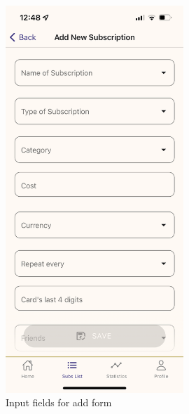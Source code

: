 \documentclass[12pt]{article}
\begin{document}
\begin{figure}[h!]
\begin{minipage}[c]{0.45\textwidth}
        \includegraphics[width=0.6\textwidth, clip]{../../assets/smartphone/add.PNG}
        \caption{Input fields for add form}
        \label{fig:add}
    \end{minipage}
\end{figure}
\end{document}
